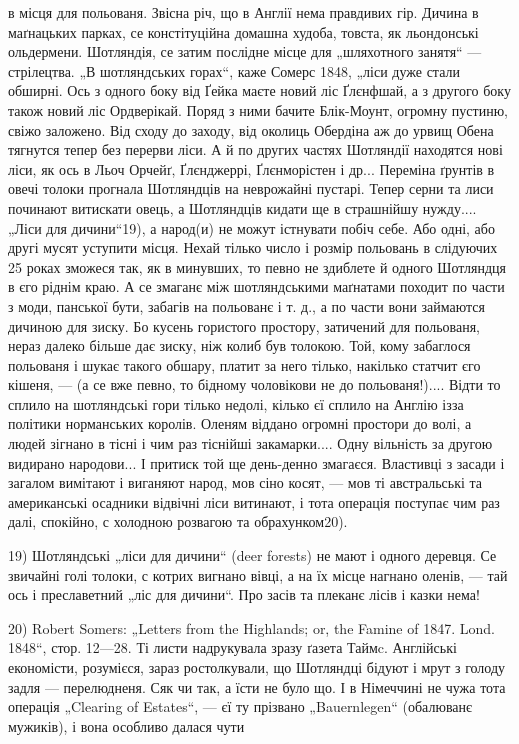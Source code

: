 в місця для польованя. Звісна річ, що в Англії нема правдивих гір. Дичина в маґнацьких парках, се
констітуційна домашна худоба, товста, як льондонські ольдермени. Шотляндія, се затим послідне місце
для „шляхотного занятя“ — стрілецтва. „В шотляндських горах“, каже Сомерс 1848, „ліси дуже стали
обширні. Ось з одного боку від Ґейка маєте новий ліс Ґлєнфшай, а з другого боку також новий ліс
Ордверікай. Поряд з ними бачите Блік-Моунт, огромну пустиню, свіжо заложено. Від сходу до заходу,
від околиць Обердіна аж до урвищ Обена тягнутся тепер без перерви ліси. А й по других частях
Шотляндії находятся нові ліси, як ось в Льоч Орчейґ, Ґлєнджеррі, Ґлєнморістен і др... Переміна
ґрунтів в овечі толоки прогнала Шотляндців на неврожайні пустарі. Тепер серни та лиси починают
витискати овець, а Шотляндців кидати ще в страшнійшу нужду.... „Ліси для дичини“19), а народ(и) не
можут істнувати побіч себе. Або одні, або другі мусят уступити місця. Нехай тілько число і розмір
польовань в слідуючих 25 роках зможеся так, як в минувших, то певно не здиблете й одного Шотляндця в
єго ріднім краю. А се змаганє між шотляндськими маґнатами походит по части з моди, панської бути,
забагів на польованє і т. д., а по части вони займаются дичиною для зиску. Бо кусень гористого
простору, затичений для польованя, нераз далеко більше дає зиску, ніж колиб був толокою. Той, кому
забаглося польованя і шукає такого обшару, платит за него тілько, накілько статчит єго кішеня,
— (а се вже певно, то бідному чоловікови не до польованя!).... Відти то сплило на шотляндські гори
тілько недолі, кілько єї сплило на Англію ізза політики норманських
королів. Оленям віддано огромні простори до волі, а людей зігнано в тісні і чим раз тіснійші
закамарки.... Одну вільність за другою видирано народови... І притиск той ще
день-денно змагаєся. Властивці з засади і загалом вимітают і виганяют народ, мов сіно косят, — мов
ті австральські та американські осадники відвічні ліси витинают, і тота операція поступає чим раз
далі, спокійно, с холодною розвагою та обрахунком20).

19) Шотляндські „ліси для дичини“ (deer forests) не мают і одного деревця. Се звичайні голі толоки,
с котрих вигнано вівці, а на їх місце нагнано оленів, — тай ось і преславетний „ліс для дичини“. Про
засів та плеканє лісів і казки нема!

20) Robert Somers: „Letters from the Highlands; or, the Famine of 1847. Lond. 1848“, стор. 12—28. Ті
листи надрукувала зразу ґазета Таймc. Англійські економісти, розумієся, зараз ростолкували, що
Шотляндці бідуют і мрут з голоду задля — перелюдненя. Сяк чи так, а їсти не було що. І в Німеччині
не чужа тота операція „Clearing of Estates“, — єї ту прізвано „Bauernlegen“ (обалюванє мужиків), і
вона особливо далася чути
